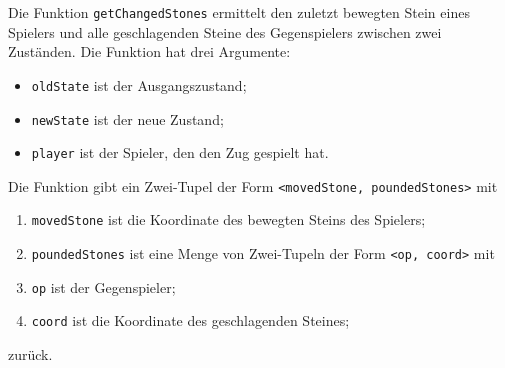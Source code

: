 \documentclass[11pt]{article}
\providecommand{\tightlist}{%
      \setlength{\itemsep}{0pt}\setlength{\parskip}{0pt}}
\begin{document}
    Die Funktion \texttt{getChangedStones} ermittelt den zuletzt bewegten
Stein eines Spielers und alle geschlagenden Steine des Gegenspielers
zwischen zwei Zuständen. Die Funktion hat drei Argumente:

\begin{itemize}
\tightlist
\item
  \texttt{oldState} ist der Ausgangszustand;
\item
  \texttt{newState} ist der neue Zustand;
\item
  \texttt{player} ist der Spieler, den den Zug gespielt hat.
\end{itemize}

Die Funktion gibt ein Zwei-Tupel der Form
\texttt{\textless{}movedStone,\ poundedStones\textgreater{}} mit
\begin{enumerate}
    \item \texttt{movedStone} ist die Koordinate des bewegten Steins des Spielers;
    \item \texttt{poundedStones} ist eine Menge von Zwei-Tupeln der Form \texttt{\textless{}op,\ coord\textgreater{}} mit
    \item \texttt{op} ist der Gegenspieler;
    \item \texttt{coord} ist die Koordinate des geschlagenden Steines;
\end{enumerate}

zurück.
\end{document}

